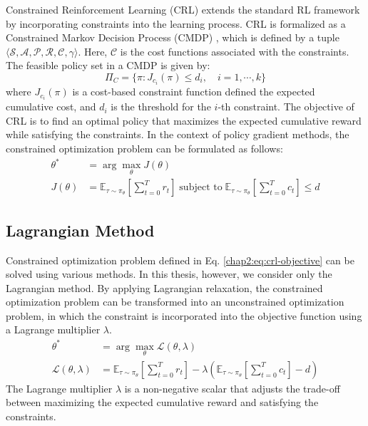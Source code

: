 Constrained Reinforcement Learning (CRL) extends the standard RL framework by incorporating constraints into the learning process.
CRL is formalized as a Constrained Markov Decision Process (CMDP) \cite{CMDP}, which is defined by a tuple $\langle \mathcal{S}, \mathcal{A}, \mathcal{P}, \mathcal{R}, \mathcal{C}, \gamma \rangle$.
Here, $\mathcal{C}$ is the cost functions associated with the constraints.
The feasible policy set in a CMDP is given by:
\begin{equation}
  \Pi_C = \{\pi: J_{c_i}(\pi) \leq d_i, \quad i = 1, \cdots, k\}
\end{equation}
where $J_{c_i}(\pi)$ is a cost-based constraint function defined the expected cumulative cost, and $d_i$ is the threshold for the $i$-th constraint.
The objective of CRL is to find an optimal policy that maximizes the expected cumulative reward while satisfying the constraints.
In the context of policy gradient methods, the constrained optimization problem can be formulated as follows:
\begin{equation} \label{chap2:eq:crl-objective}
  \begin{aligned}
    \theta^* &= \arg\max_\theta J(\theta) \\
    J(\theta) &= \mathbb{E}_{\tau \sim \pi_\theta} \left[ \sum^T_{t = 0} r_t \right] \; \text{subject to} \; \mathbb{E}_{\tau \sim \pi_\theta} \left[ \sum^T_{t = 0} c_t \right] \leq d
  \end{aligned}
\end{equation}

\subsection{Lagrangian Method}

Constrained optimization problem defined in Eq. \ref{chap2:eq:crl-objective} can be solved using various methods.
In this thesis, however, we consider only the Lagrangian method.
By applying Lagrangian relaxation, the constrained optimization problem can be transformed into an unconstrained optimization problem, in which the constraint is incorporated into the objective function using a Lagrange multiplier $\lambda$.
\begin{equation}
  \begin{aligned}
    \theta^* &= \arg\max_\theta \mathcal{L}(\theta, \lambda) \\
    \mathcal{L}(\theta, \lambda) &= \mathbb{E}_{\tau \sim \pi_\theta} \left[ \sum^T_{t = 0} r_t \right] - \lambda \left( \mathbb{E}_{\tau \sim \pi_\theta} \left[ \sum^T_{t = 0} c_t \right] - d \right)
  \end{aligned}
\end{equation}
The Lagrange multiplier $\lambda$ is a non-negative scalar that adjusts the trade-off between maximizing the expected cumulative reward and satisfying the constraints.

